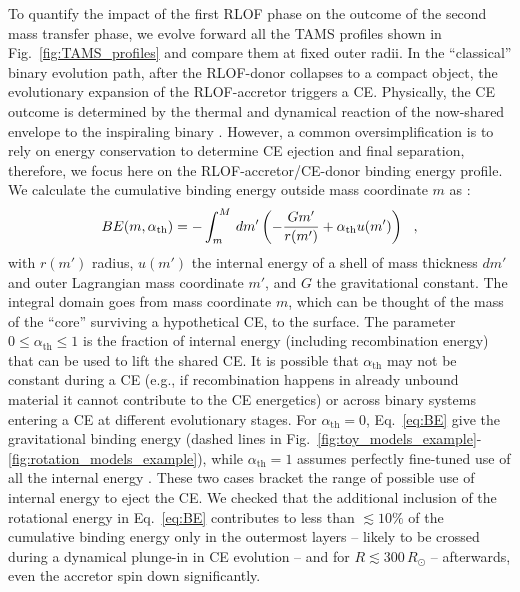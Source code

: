 \documentclass[twocolumn,twocolappendix,trackchanges]{aastex63}
\DeclareRobustCommand{\Eqref}[1]{Eq.~\ref{#1}}
\DeclareRobustCommand{\Figref}[1]{Fig.~\ref{#1}}
\begin{document}
To quantify the impact of the first RLOF phase on the outcome of the
second mass transfer phase, we evolve forward all the TAMS profiles
shown in \Figref{fig:TAMS_profiles} and compare them at fixed outer
radii.
In the ``classical'' binary evolution path, after the RLOF-donor
collapses to a compact object, the evolutionary expansion of the
RLOF-accretor triggers a CE. Physically, the CE outcome is determined by
the thermal and dynamical reaction of the now-shared envelope to the
inspiraling binary \citep[e.g.,][]{ivanova:2013, ivanova:2020, renzo:21gwce}.
However, a common oversimplification is to rely on energy conservation
\citep[``$\alpha_{\mathrm{CE}}\lambda_\mathrm{CE}$ algorithm'',
e.g.,][]{webbink:1984, dekool:1990} to determine CE ejection and final
separation, therefore, we focus here on the RLOF-accretor/CE-donor
binding energy profile. We calculate the cumulative binding energy outside
mass coordinate $m$ as \citep[e.g.,][]{dekool:1990, han:95, dewi:2000,
  lau:2022}:
\begin{equation}
  \label{eq:BE}
BE(m, \alpha_{\rm th}) = - \int_{m}^M\,dm'\left( -\frac{G m'}{r(m')}+\alpha_\mathrm{th} u(m')\right) \ \ ,
\end{equation}
with $r(m')$ radius, $u(m')$ the internal energy of a shell of mass
thickness $dm'$ and outer Lagrangian mass coordinate $m'$, and $G$ the
gravitational constant. The integral domain goes from mass coordinate
$m$, which can be thought of the mass of the ``core'' surviving a
hypothetical CE, to the surface. The parameter
$0\leq \alpha_\mathrm{th}\leq 1$ is the fraction of internal energy
(including recombination energy) that can be used to lift the shared
CE. It is possible that $\alpha_\mathrm{th}$ may not be constant
during a CE (e.g., if recombination happens in already unbound
material it cannot contribute to the CE energetics) or across binary
systems entering a CE at different evolutionary stages. For
$\alpha_\mathrm{th}=0$, \Eqref{eq:BE} give the gravitational binding
energy (dashed lines in
\Figref{fig:toy_models_example}-\ref{fig:rotation_models_example}),
while $\alpha_{\mathrm{th}}=1$ assumes perfectly fine-tuned use of all
the internal energy \citep[solid lines,][]{klencki:2020}. These two
cases bracket the range of possible use of internal energy to eject
the CE. We checked that the additional inclusion of the rotational
energy in \Eqref{eq:BE} %
contributes to less than $\lesssim 10\%$ of the cumulative binding
energy only in the outermost layers -- likely to be crossed during a
dynamical plunge-in in CE evolution -- and for $R\lesssim 300\,R_\odot$
-- afterwards, even the accretor spin down significantly.
\end{document}
